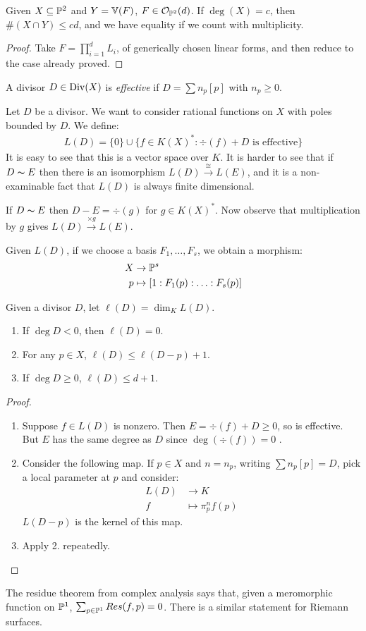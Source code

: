 \documentclass[10pt,a4paper,rgb]{article}
\begin{document}
\begin{theorem}
Given $X \subseteq \P^2$ and $Y = \V(F)$, $F \in \mathcal{O}_{\P^2}(d)$. If $\deg(X) = c$, then $\#(X\cap Y) \leq cd$, and we have equality if we count with multiplicity.
\end{theorem}
\begin{proof}
Take $F = \prod_{i=1}^d L_i$, of generically chosen linear forms, and then reduce to the case already proved.
\end{proof}
A divisor $D \in \Div(X)$ is \emph{effective} if $D = \sum n_p[p]$ with $n_p \geq 0$.

Let $D$ be a divisor. We want to consider rational functions on $X$ with poles bounded by $D$. We define:
\begin{align*}
L(D) = \{0\} \cup \{f \in K(X)^{\ast} : \div(f) + D\text{ is effective}\}
\end{align*}
It is easy to see that this is a vector space over $K$. It is harder to see that if $D \thicksim E$ then there is an isomorphism $L(D) \xrightarrow{\cong}L(E)$, and it is a non-examinable fact that $L(D)$ is always finite dimensional.

If $D \thicksim E$ then $D-E = \div(g)$ for $g \in K(X)^{\ast}$. Now observe that multiplication by $g$ gives $L(D) \xrightarrow{\times g} L(E)$.

Given $L(D)$, if we choose a basis $F_1, \ldots, F_s$, we obtain a morphism:
\begin{align*}
X &\to \P^s\\
p &\mapsto [1:F_1(p):\ldots:F_s(p)]
\end{align*}
\begin{proposition}
Given a divisor $D$, let $\ell(D) = \dim_K L(D)$.
\begin{enumerate}
\item If $\deg D < 0$, then $\ell(D) = 0$.
\item For any $p \in X$, $\ell(D) \leq \ell(D-p)+1$.
\item If $\deg D \geq 0$, $\ell(D) \leq d+1$.
\end{enumerate}
\end{proposition}
\begin{proof}
\item
\begin{enumerate}
\item Suppose $f \in L(D)$ is nonzero. Then $E = \div(f) + D \geq 0$, so is effective. But $E$ has the same degree as $D$ since $\deg(\div(f)) = 0$ \contr.
\item Consider the following map. If $p \in X$ and $n = n_p$, writing $\sum n_p[p] = D$, pick a local parameter at $p$ and consider:
\begin{align*}
L(D) &\to K\\
f &\mapsto \pi_p^n f(p)
\end{align*}
$L(D-p)$ is the kernel of this map.
\item Apply 2. repeatedly.
\end{enumerate}
\end{proof}
The residue theorem from complex analysis says that, given a meromorphic function on $\P^1$, $\sum_{p \in \P^1} Res(f,p) = 0$. There is a similar statement for Riemann surfaces.
\end{document}
